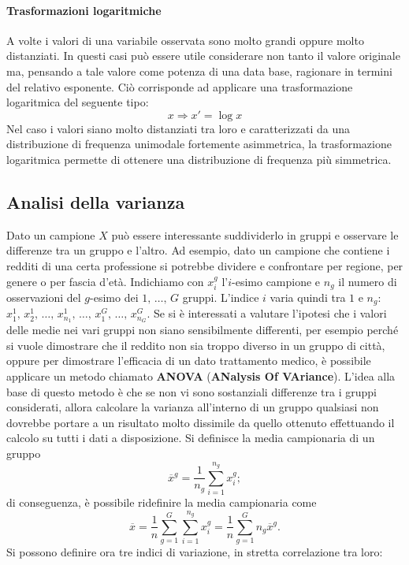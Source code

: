 \paragraph{Trasformazioni logaritmiche}
A volte i valori di una variabile osservata sono molto grandi oppure molto distanziati. In questi casi può essere utile considerare non tanto il valore originale ma, pensando a tale valore come potenza di una data base, ragionare in termini del relativo esponente. Ciò corrisponde ad applicare una trasformazione logaritmica del seguente tipo:
\[
x \Rightarrow x' = \log x
\]
Nel caso i valori siano molto distanziati tra loro e caratterizzati da una distribuzione di frequenza unimodale fortemente asimmetrica, la trasformazione logaritmica permette di ottenere una distribuzione di frequenza più simmetrica.

\subsection{Analisi della varianza}
Dato un campione $X$ può essere interessante suddividerlo in gruppi e osservare le differenze tra un gruppo e l'altro.
\noindent Ad esempio, dato un campione che contiene i redditi di una certa professione si potrebbe dividere e confrontare per regione, per genere o per fascia d'età.
\newline Indichiamo con $x_i^g$ l'$i$-esimo campione e $n_g$ il numero di osservazioni del $g$-esimo dei $1, \, \dots, \, G$ gruppi.
L'indice $i$ varia quindi tra $1$ e $n_g$:
$x_1^1, \, x_2^1, \, \dots, \, x_{n_1}^1, \, \dots, \, x_{1}^{G}, \, \dots, \, x_{n_G}^G$.
Se si è interessati a valutare l’ipotesi che i valori delle medie nei vari gruppi non siano sensibilmente differenti, per esempio perché si vuole dimostrare che il reddito non sia troppo diverso in un gruppo di città, oppure per dimostrare l’eﬀicacia di un dato trattamento medico, è possibile applicare un metodo chiamato \textbf{ANOVA} (\textbf{ANalysis Of VAriance}). L’idea alla base di questo metodo è che se non vi sono sostanziali differenze tra i gruppi considerati, allora calcolare la varianza all’interno di un gruppo qualsiasi non dovrebbe portare a un risultato molto dissimile da quello ottenuto effettuando il calcolo su tutti i dati a disposizione.
Si definisce la media campionaria di un gruppo \[
\overline{x}^g = \frac{1}{n_g} \sum_{i=1}^{n_g}{x_i^g};
\] 
di conseguenza, è possibile ridefinire la media campionaria come \[
\overline{x} = \frac{1}{n} \sum_{g=1}^G{\sum_{i=1}^{n_g}{x_i^g}} = \frac{1}{n} \sum_{g=1}^G{n_g \overline{x}^g}.
\]
Si possono definire ora tre indici di variazione, in stretta correlazione tra loro:
